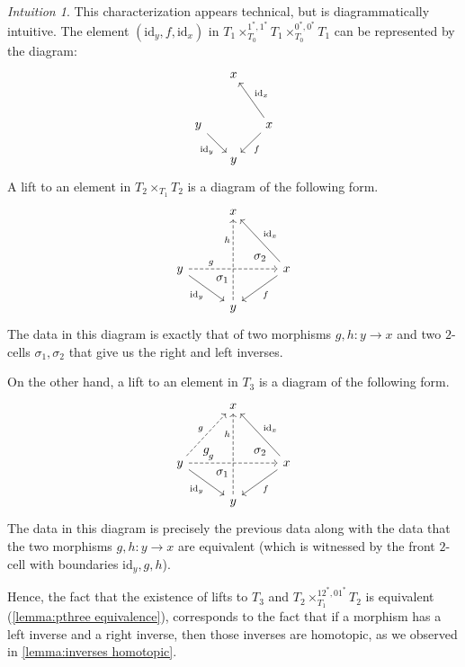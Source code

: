 \documentclass[11pt, a4paper]{amsart}
\newcommand{\id}{\mathrm{id}}
\theoremstyle{definition}
\theoremstyle{remark}
\newtheorem{intuition}[equation]{Intuition}
\numberwithin{equation}{section}
\begin{document}
 \begin{intuition} \label{intuition:homotopy equivalence tetrahedron}
  This characterization appears technical, but is diagrammatically intuitive. The element $(\id_y, f, \id_x)$ in $T_1 \times^{1^*,1^*}_{T_0} T_1 \times^{0^*,0^*}_{T_0} T_1$  can be represented by the diagram:
    \[
    \begin{tikzcd}[row sep=0.5cm, column sep=0.5cm]
     & x & \\
     & & \\
     y \arrow[dr, "\id_y"'] & & x \arrow[dl, "f"] \arrow[uul, "\id_x"'] \\
     & y 
    \end{tikzcd}
   \]
   A lift to an element in $T_2 \times_{T_1} T_2$ is a diagram of the following form.
    \[
    \begin{tikzcd}[row sep=0.6cm, column sep=1cm]
     & x & \\
     & & \\
     y \arrow[dr, "\id_y"'] \arrow[rr, ""{name=U, above}, "g" near start, dashed] & & x \arrow[dl, "f"] \arrow[uul, "\id_x"'] \\
     & y \arrow[uuu, dashed, "h" near end]
      \arrow[start anchor={[xshift=10ex, yshift=10ex]}, to=U, phantom, "\sigma_2"]
     \arrow[start anchor={[xshift=-4ex, yshift=2ex]}, to=U, phantom, "\sigma_1"]
    \end{tikzcd}
    \]
  The data in this diagram is exactly that of two morphisms $g,h\colon y \to x$ and two $2$-cells $\sigma_1, \sigma_2$ that give us the right and left inverses. 

  On the other hand, a lift to an element in $T_3$ is a diagram of the following form.
    \[
    \begin{tikzcd}[row sep=0.6cm, column sep=1cm]
     & x & \\
     & & \\
     y \arrow[uur, dashed, "g"] \arrow[dr, "\id_y"'] \arrow[rr, ""{name=U, above}, "g" near start, dashed] & & x \arrow[dl, "f"] \arrow[uul, "\id_x"'] \\
     & y \arrow[uuu, dashed, "h" near end]
      \arrow[start anchor={[xshift=-10ex, yshift=10ex]}, to=U, phantom, "g"]
      \arrow[start anchor={[xshift=10ex, yshift=10ex]}, to=U, phantom, "\sigma_2"]
     \arrow[start anchor={[xshift=-4ex, yshift=2ex]}, to=U, phantom, "\sigma_1"]
    \end{tikzcd}
   \]
   The data in this diagram is precisely the previous data along with the data that the two morphisms $g,h\colon y \to x$ are equivalent (which is witnessed by the front $2$-cell with boundaries $\id_y,g,h$).

   Hence, the fact that the existence of lifts to $T_3$ and $T_2 \times^{12^*,01^*}_{T_1} T_2$ is equivalent (\cref{lemma:pthree equivalence}), corresponds to the fact that if a morphism has a left inverse and a right inverse, then those inverses are homotopic, as we observed in \cref{lemma:inverses homotopic}.
   
 \end{intuition}
\end{document}
